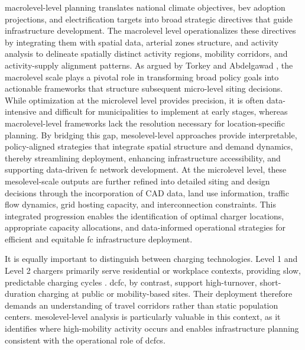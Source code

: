 \Gls{macrolevel}-level planning translates national climate objectives, \gls{bev} adoption projections, and electrification targets into broad strategic directives that guide infrastructure development. The \gls{macrolevel} level operationalizes these directives by integrating them with spatial data, arterial zones structure, and activity analysis to delineate spatially distinct activity regions, mobility corridors, and activity-supply alignment patterns. As argued by Torkey and Abdelgawad \cite{torkey2022}, the \gls{macrolevel} scale plays a pivotal role in transforming broad policy goals into actionable frameworks that structure subsequent micro-level siting decisions. While optimization at the \gls{microlevel} level provides precision, it is often data-intensive and difficult for municipalities to implement at early stages, whereas \gls{macrolevel}-level frameworks lack the resolution necessary for location-specific planning. By bridging this gap, \gls{mesolevel}-level approaches provide interpretable, policy-aligned strategies that integrate spatial structure and demand dynamics, thereby streamlining deployment, enhancing infrastructure accessibility, and supporting data-driven \gls{fc} network development. At the \gls{microlevel} level, these \gls{mesolevel}-scale outputs are further refined into detailed siting and design decisions through the incorporation of CAD data, land use information, traffic flow dynamics, grid hosting capacity, and interconnection constraints. This integrated progression enables the identification of optimal charger locations, appropriate capacity allocations, and data-informed operational strategies for efficient and equitable \gls{fc} infrastructure deployment.

It is equally important to distinguish between charging technologies. Level 1 and Level 2 chargers primarily serve residential or workplace contexts, providing slow, predictable charging cycles \cite{shi2018}. \acrfull{dcfc}, by contrast, support high-turnover, short-duration charging at public or mobility-based sites. Their deployment therefore demands an understanding of travel corridors rather than static population centers. \Gls{mesolevel}-level analysis is particularly valuable in this context, as it identifies where high-mobility activity occurs and enables infrastructure planning consistent with the operational role of \gls{dcfc}s.

